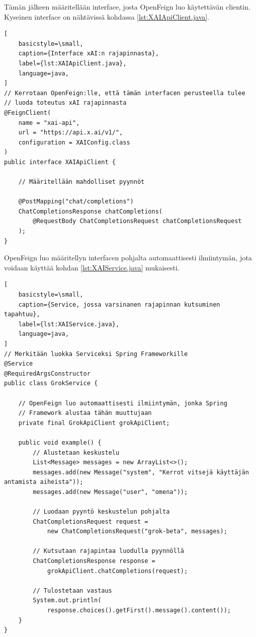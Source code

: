 Tämän jälkeen määritellään interface, josta OpenFeign luo käytettävän clientin.
Kyseinen interface on nähtävissä kohdassa \ref{lst:XAIApiClient.java}.

\begin{lstlisting}[
    basicstyle=\small,
    caption={Interface xAI:n rajapinnasta},
    label={lst:XAIApiClient.java},
    language=java,
]
// Kerrotaan OpenFeign:lle, että tämän interfacen perusteella tulee
// luoda toteutus xAI rajapinnasta
@FeignClient(
    name = "xai-api",
    url = "https://api.x.ai/v1/",
    configuration = XAIConfig.class
)
public interface XAIApiClient {

    // Määritellään mahdolliset pyynnöt

    @PostMapping("chat/completions")
    ChatCompletionsResponse chatCompletions(
        @RequestBody ChatCompletionsRequest chatCompletionsRequest
    );
}
\end{lstlisting}

OpenFeign luo määritellyn interfacen pohjalta automaattisesti ilmiintymän, jota
voidaan käyttää kohdan \ref{lst:XAIService.java} mukaisesti.

\begin{lstlisting}[
    basicstyle=\small,
    caption={Service, jossa varsinanen rajapinnan kutsuminen tapahtuu},
    label={lst:XAIService.java},
    language=java,
]
// Merkitään luokka Serviceksi Spring Frameworkille
@Service
@RequiredArgsConstructor
public class GrokService {

    // OpenFeign luo automaattisesti ilmiintymän, jonka Spring
    // Framework alustaa tähän muuttujaan
    private final GrokApiClient grokApiClient;

    public void example() {
        // Alustetaan keskustelu
        List<Message> messages = new ArrayList<>();
        messages.add(new Message("system", "Kerrot vitsejä käyttäjän antamista aiheista"));
        messages.add(new Message("user", "omena"));

        // Luodaan pyyntö keskustelun pohjalta
        ChatCompletionsRequest request =
            new ChatCompletionsRequest("grok-beta", messages);

        // Kutsutaan rajapintaa luodulla pyynnöllä
        ChatCompletionsResponse response =
            grokApiClient.chatCompletions(request);

        // Tulostetaan vastaus
        System.out.println(
            response.choices().getFirst().message().content());
    }
}
\end{lstlisting}

